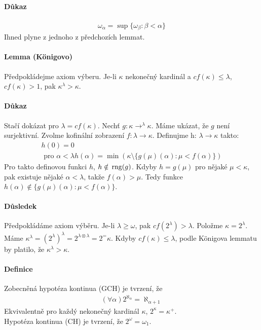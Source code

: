 \documentclass[a4paper,12pt,titlepage]{article}
\begin{document}
\paragraph{Důkaz}
\begin{align}
	\omega_\alpha = \sup\{\omega_\beta : \beta < \alpha \}
\end{align}
Ihned plyne z jednoho z předchozích lemmat.
\paragraph{Lemma (Königovo)}
Předpokládejme axiom výberu. Je-li $\kappa$ nekonečný kardinál a $cf(\kappa) \le
\lambda$, $cf(\kappa) > 1$, pak $\kappa^\lambda > \kappa$.
\paragraph{Důkaz}
Stačí dokázat pro $\lambda = cf(\kappa)$. 
Nechť $g : \kappa \to ^\lambda \kappa$. Máme ukázat, že $g$ není surjektivní.
Zvolme kofinální zobrazení $f: \lambda \to \kappa$. Definujme h: $\lambda \to
\kappa$ takto: 
\begin{align}
	h(0) = 0 \\
	\text{ pro } \alpha < \lambda h(\alpha) = \min \left( \kappa \setminus
	\{g(\mu)(\alpha) : \mu < f(\alpha) \} \right)
\end{align}
Pro takto definovou funkci $h$, $h \notin \operatorname*{\,rng}(g)$. Kdyby $h = g(\mu)$ pro nějaké
$\mu <\kappa$, pak existuje nějaké $\alpha <\lambda$, takže $f(\alpha) >\mu$.
Tedy funkce $h(\alpha) \nin \{g(\mu)(\alpha) : \mu < f(\alpha)\}$.
\paragraph{Důsledek}
Předpokládáme axiom výběru. Je-li $\lambda \ge \omega$, pak $cf(2^\lambda) >
\lambda$. Položme $\kappa = 2^\lambda$. Máme $\kappa^\lambda = (2^\lambda)^\lambda
= 2^{\lambda \otimes\lambda} = 2^ = \kappa$. Kdyby $cf(\kappa) \le \lambda$,
podle Königova lemmatu by platilo, že $\kappa^\lambda > \kappa$.
\paragraph{Definice}
Zobecněná hypotéza kontinua (GCH) je tvrzení, že 
\begin{align}
	(\forall \alpha) 2^{\aleph_\alpha} = \aleph_{\alpha + 1}
\end{align}
Ekvivalentně pro každý nekonečný kardinál $\kappa$, $2^\kappa = \kappa^+$. \\
Hypotéza kontinua (CH) je tvrzení, že $2^\omega = \omega_1$.
\end{document}
